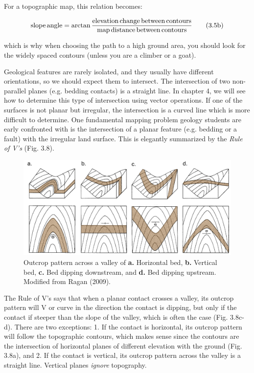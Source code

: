 \documentclass[a4paper , 12pt]{book}
\begin{document}
For a topographic map, this relation becomes:

\begin{equation}
    \text{slope\,angle} = \arctan\frac{\text{elevation\,change\,between\,contours}}{\text{map\,distance\,between\,contours}} \tag{3.5b}
\end{equation}

which is why when choosing the path to a high ground area, you should look for the widely spaced contours (unless you are a climber or a goat).

Geological features are rarely isolated, and they usually have different orientations, so we should expect them to intersect. The intersection of two non-parallel planes (e.g. bedding contacts) is a straight line. In chapter 4, we will see how to determine this type of intersection using vector operations. If one of the surfaces is not planar but irregular, the intersection is a curved line which is more difficult to determine. One fundamental mapping problem geology students are early confronted with is the intersection of a planar feature (e.g. bedding or a fault) with the irregular land surface. This is elegantly summarized by the \textit{Rule of V’s} (Fig. 3.8).

\begin{figure}[ht]
    \centering
    \includegraphics[width=13cm]{ch3f8.pdf}
    \caption{Outcrop pattern across a valley of \textbf{a.} Horizontal bed, \textbf{b.} Vertical bed, \textbf{c.} Bed dipping downstream, and \textbf{d.} Bed dipping upstream. Modified from Ragan (2009).}
\end{figure}

The Rule of V’s says that when a planar contact crosses a valley, its outcrop pattern will V or curve in the direction the contact is dipping, but only if the contact if steeper than the slope of the valley, which is often the case (Fig. 3.8c-d). There are two exceptions: 1. If the contact is horizontal, its outcrop pattern will follow the topographic contours, which makes sense since the contours are the intersection of horizontal planes of different elevation with the ground (Fig. 3.8a), and 2. If the contact is vertical, its outcrop pattern across the valley is a straight line. Vertical planes \textit{ignore} topography.
\end{document}

